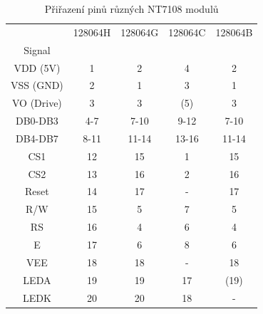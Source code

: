 \begin{table}[H]
  \begin{center}
    \begin{tabular}{| c || c | c | c | c |}
    \hline
           & 128064H  &  128064G  & 128064C  & 128064B \\
    Signal &         &          &         &         \\
    \hline
    \hline
  VDD (5V) &   1     &  2       &   4     & 2       \\
    \hline
  VSS (GND) &   2     &  1       &   3     & 1       \\
    \hline
 VO (Drive) &   3     &  3       &  (5)    & 3       \\
    \hline
  DB0-DB3   &   4-7   &  7-10    &   9-12  & 7-10    \\
    \hline
  DB4-DB7   &   8-11  &  11-14   &   13-16 & 11-14   \\
    \hline
  CS1       &   12    &  15      &   1     & 15      \\
  CS2       &   13    &  16      &   2     & 16      \\
    \hline
  Reset     &   14    &  17      &   -     & 17      \\
    \hline
  R/W       &   15    &  5       &   7     & 5       \\
    \hline
  RS        &   16    &  4       &   6     & 4       \\
    \hline
  E         &   17    &  6       &   8     & 6       \\
    \hline
  VEE       &   18    &  18      &   -     & 18      \\
    \hline
  LEDA      &   19    &  19      &   17    & (19)      \\
  LEDK      &   20    &  20      &   18    & -      \\
    \hline
    \end{tabular}
  \end{center}
  	\vspace{-0.6cm} 
  \caption{Přiřazení pinů různých NT7108 modulů}
  \label{tab:NT7108types}
\end{table}
\vspace{-0.3cm} 
